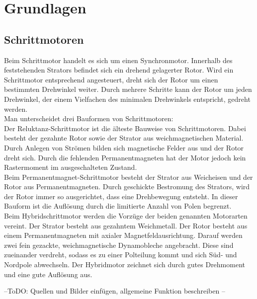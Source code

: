 

\chapter{Grundlagen}

\section{Schrittmotoren}

Beim Schrittmotor handelt es sich um einen Synchronmotor. Innerhalb des feststehenden Strators befindet sich ein drehend gelagerter Rotor. Wird ein Schrittmotor entsprechend angesteuert, dreht sich der Rotor um einen bestimmten Drehwinkel weiter. Durch mehrere Schritte kann der Rotor um jeden Drehwinkel, der einem Vielfachen des minimalen Drehwinkels entspricht, gedreht werden. \\
Man unterscheidet drei Bauformen von Schrittmotoren: \\
Der Reluktanz-Schrittmotor ist die älteste Bauweise von Schrittmotoren. Dabei besteht der gezahnte Rotor sowie der Strator aus weichmagnetischen Material. Durch Anlegen von Strömen bilden sich magnetische Felder aus und der Rotor dreht sich. Durch die fehlenden Permanentmagneten hat der Motor jedoch kein Rastermoment im ausgeschalteten Zustand.\\
Beim Permanentmagnet-Schrittmotor besteht der Strator aus Weicheisen und der Rotor aus Permanentmagneten. Durch geschickte Bestromung des Strators, wird der Rotor immer so ausgerichtet, dass eine Drehbewegung entsteht. In dieser Bauform ist die Auflösung durch die limitierte Anzahl von Polen begrenzt.\\

Beim Hybridschrittmotor werden die Vorzüge der beiden genannten Motorarten vereint. Der Strator besteht aus gezahntem Weichmetall. Der Rotor besteht aus einem Permanentmagneten mit axialer Magnetfeldausrichtung. Darauf werden zwei fein gezackte, weichmagnetische Dynamobleche angebracht. Diese sind zueinander verdreht, sodass es zu einer Polteilung kommt und sich Süd- und Nordpole abwechseln. Der Hybridmotor zeichnet sich durch gutes Drehmoment und eine gute Auflösung aus.

--ToDO: Quellen und Bilder einfügen, allgemeine Funktion beschreiben --